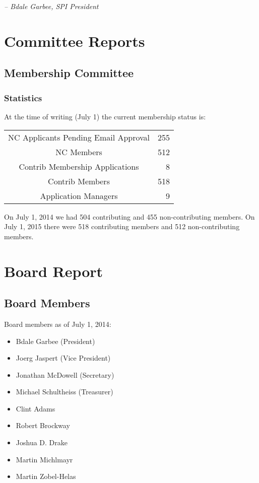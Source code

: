 \documentclass[letterpaper]{report}
\begin{document}
  \emph{-- Bdale Garbee, SPI President}

\chapter{Committee Reports}
\section{Membership Committee}

\subsection{Statistics}

At the time of writing (July 1) the current membership status is:

\begin{tabular}{ | c | r | }
\hline
NC Applicants Pending Email Approval	& 255\\
NC Members				& 512\\
Contrib Membership Applications		& 8\\
Contrib Members				& 518\\
Application Managers			& 9\\
\hline
\end{tabular}

On July 1, 2014 we had 504 contributing and 455 non-contributing members.
On July 1, 2015 there were 518 contributing members and 512 non-contributing
members.


\chapter{Board Report}
\section{Board Members}

Board members as of July 1, 2014:

\begin{itemize}
\item Bdale Garbee (President)
\item Joerg Jaspert (Vice President)
\item Jonathan McDowell (Secretary)
\item Michael Schultheiss (Treasurer)
\item Clint Adams
\item Robert Brockway
\item Joshua D. Drake
\item Martin Michlmayr
\item Martin Zobel-Helas
\end{itemize}
\end{document}
